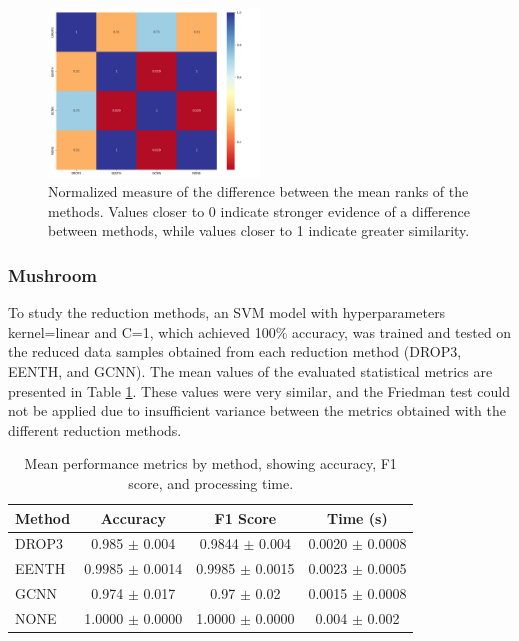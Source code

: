 \begin{figure}[h!]
    \centering
    \includegraphics[width=0.5\textwidth]{figures/svm/hepatitis/svm_results_heatmap.png}
    \caption{Normalized measure of the difference between the mean ranks of the methods. Values closer to 0 indicate stronger evidence of a difference between methods, while values closer to 1 indicate greater similarity.}
    \label{fig:hep_svm_red}
\end{figure}

\subsubsection{Mushroom}

To study the reduction methods, an SVM model with hyperparameters kernel=linear and C=1, which achieved 100$\%$ accuracy, was trained and tested on the reduced data samples obtained from each reduction method (DROP3, EENTH, and GCNN). The mean values of the evaluated statistical metrics are presented in Table \ref{tab:method_metrics_m}. These values were very similar, and the Friedman test could not be applied due to insufficient variance between the metrics obtained with the different reduction methods.

\begin{table}[h!]
\centering
\begin{tabular}{|l|c|c|c|}
\hline
\textbf{Method} & \textbf{Accuracy} & \textbf{F1 Score} & \textbf{Time (s)} \\
\hline
DROP3 & 0.985 $\pm$ 0.004 & 0.9844 $\pm$ 0.004 & 0.0020 $\pm$ 0.0008 \\
\hline
EENTH & 0.9985 $\pm$ 0.0014 & 0.9985 $\pm$ 0.0015 & 0.0023 $\pm$ 0.0005 \\
\hline
GCNN  & 0.974 $\pm$ 0.017 & 0.97 $\pm$ 0.02 & 0.0015 $\pm$ 0.0008 \\
\hline
NONE  & 1.0000 $\pm$ 0.0000 & 1.0000 $\pm$ 0.0000 & 0.004 $\pm$ 0.002 \\
\hline
\end{tabular}
\caption{Mean performance metrics by method, showing accuracy, F1 score, and processing time.}
\label{tab:method_metrics_m}
\end{table}


